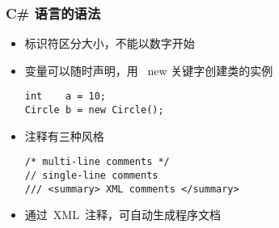
\begin{frame}[fragile]
\frametitle{C\# 语言的语法}
\begin{itemize}
\item 标识符区分大小，不能以数字开始
  \pause
\item 变量可以随时声明，用 ~new 关键字创建类的实例
\begin{lstlisting}
int    a = 10;
Circle b = new Circle();
\end{lstlisting}
  \pause
\item 注释有三种风格
\begin{lstlisting}
/* multi-line comments */
// single-line comments
/// <summary> XML comments </summary>
\end{lstlisting}

  \pause

\item  通过~XML~注释，可自动生成程序文档

\end{itemize}
\end{frame}


